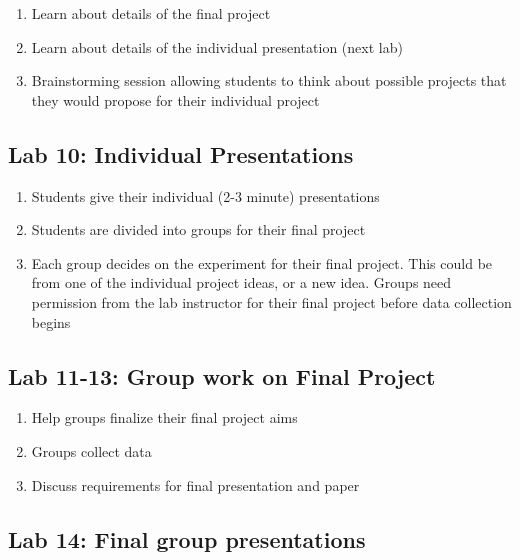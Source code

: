 \begin{enumerate}
\item Learn about details of the final project
\item Learn about details of the individual presentation (next lab)
\item Brainstorming session allowing students to think about possible projects that they would propose for their individual project
\end{enumerate}

\subsection{Lab 10: Individual Presentations}
\begin{enumerate}
\item Students give their individual (2-3 minute) presentations
\item Students are divided into groups for their final project
\item Each group decides on the experiment for their final project. This could be from one of the individual project ideas, or a new idea. Groups need permission from the lab instructor for their final project before data collection begins
\end{enumerate}

\subsection{Lab 11-13: Group work on Final Project}
\begin{enumerate}
\item Help groups finalize their final project aims
\item Groups collect data
\item Discuss requirements for final presentation and paper
\end{enumerate}

\subsection{Lab 14: Final group presentations}

